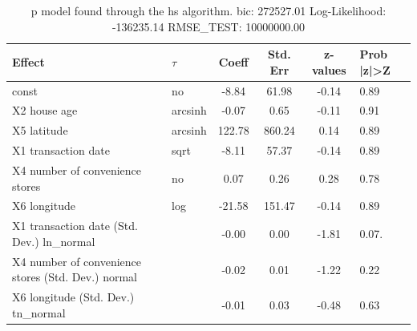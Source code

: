 \begin{table}
	\caption{p model found through the hs algorithm. bic: 272527.01 Log-Likelihood: -136235.14 RMSE_TEST: 10000000.00}
	\begin{center}
		\begin{tabular}{|l|l|c|c|c|l|}
			\hline
			Effect & $\tau$ & Coeff & Std. Err & z-values & Prob |z|>Z \\
			\hline
			const & no & -8.84 & 61.98 & -0.14 & 0.89 \\
			\hline
			X2 house age & arcsinh & -0.07 & 0.65 & -0.11 & 0.91 \\
			\hline
			X5 latitude & arcsinh & 122.78 & 860.24 & 0.14 & 0.89 \\
			\hline
			X1 transaction date & sqrt & -8.11 & 57.37 & -0.14 & 0.89 \\
			\hline
			X4 number of convenience stores & no & 0.07 & 0.26 & 0.28 & 0.78 \\
			\hline
			X6 longitude & log & -21.58 & 151.47 & -0.14 & 0.89 \\
			\hline
			X1 transaction date (Std. Dev.) ln_normal &  & -0.00 & 0.00 & -1.81 & 0.07. \\
			\hline
			X4 number of convenience stores (Std. Dev.) normal &  & -0.02 & 0.01 & -1.22 & 0.22 \\
			\hline
			X6 longitude (Std. Dev.) tn_normal &  & -0.01 & 0.03 & -0.48 & 0.63 \\
			\hline
		\end{tabular}
	\end{center}
\end{table}